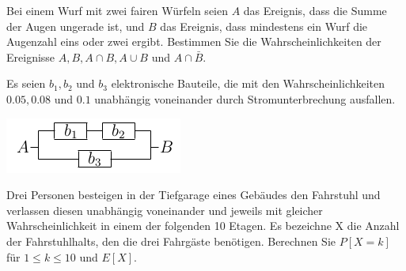 \documentclass[10pt, a4paper]{exam}
\begin{document}
\begin{questions}
    \question Bei einem Wurf mit zwei fairen Würfeln seien $A$ das Ereignis, dass die Summe der Augen ungerade ist, und $B$ das Ereignis, dass mindestens ein Wurf die Augenzahl eins oder zwei ergibt. Bestimmen Sie die Wahrscheinlichkeiten der Ereignisse $A, B, A\cap B, A\cup B$ und $A\cap\bar{B}$.
    \begin{solution}
    \end{solution}

    \question Es seien $b_1,b_2$ und $b_3$ elektronische Bauteile, die mit den Wahrscheinlichkeiten $0.05, 0.08$ und $0.1$ unabhängig voneinander durch Stromunterbrechung ausfallen.
    \begin{solution}
    \end{solution}

    \begin{center}\includegraphics[width=.2\linewidth]{Assets/GudS-schaltung.png}\end{center}

    \question Drei Personen besteigen in der Tiefgarage eines Gebäudes den Fahrstuhl und verlassen diesen unabhängig voneinander und jeweils mit gleicher Wahrscheinlichkeit in einem der folgenden 10 Etagen. Es bezeichne X die Anzahl der Fahrstuhlhalts, den die drei Fahrgäste benötigen. Berechnen Sie $P[X=k]$ für $1\leq k\leq 10$ und $E[X]$.
    \begin{solution}
    \end{solution}


\end{questions}
\end{document}
